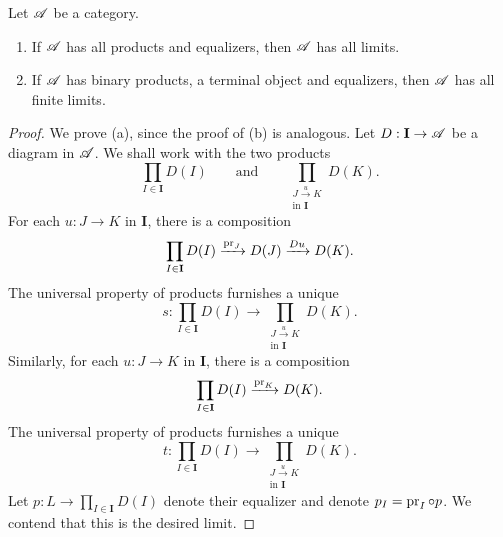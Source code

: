 \begin{proposition}
    Let $\mathscr A$ be a category. 
    \begin{enumerate}[label=(\alph*)]
        \item If $\mathscr A$ has all products and equalizers, then $\mathscr A$ has all limits. 
        \item If $\mathscr A$ has binary products, a terminal object and equalizers, then $\mathscr A$ has all finite limits.
    \end{enumerate}
\end{proposition}
\begin{proof}
    We prove (a), since the proof of (b) is analogous. Let $D:\mathbf{I}\to\mathscr A$ be a diagram in $\mathscr A$. We shall work with the two products 
    \begin{equation*}
        \prod_{I\in\mathbf{I}} D(I)\qquad\text{and}\qquad\prod_{\substack{J\xrightarrow{u} K\\\text{in }\mathbf{I}}} D(K).
    \end{equation*}
    For each $u: J\to K$ in $\mathbf{I}$, there is a composition 
    \begin{equation*}
        \prod_{I\in\mathbf{I}} D(I)\xrightarrow{\operatorname{pr}_J} D(J)\xrightarrow{Du} D(K).
    \end{equation*}
    The universal property of products furnishes a unique 
    \begin{equation*}
        s: \prod_{I\in\mathbf{I}} D(I)\longrightarrow\prod_{\substack{J\xrightarrow{u} K\\\text{in }\mathbf{I}}} D(K).
    \end{equation*}
    Similarly, for each $u: J\to K$ in $\mathbf{I}$, there is a composition 
    \begin{equation*}
        \prod_{I\in\mathbf{I}}D(I)\xrightarrow{\operatorname{pr}_K} D(K).
    \end{equation*}
    The universal property of products furnishes a unique 
    \begin{equation*}
        t: \prod_{I\in\mathbf{I}} D(I)\longrightarrow\prod_{\substack{J\xrightarrow{u} K\\\text{in }\mathbf{I}}} D(K).
    \end{equation*}
    Let $p: L\longrightarrow \prod_{I\in\mathbf{I}} D(I)$ denote their equalizer and denote $p_I = \operatorname{pr}_I\circ p$. We contend that this is the desired limit.


\end{proof}
